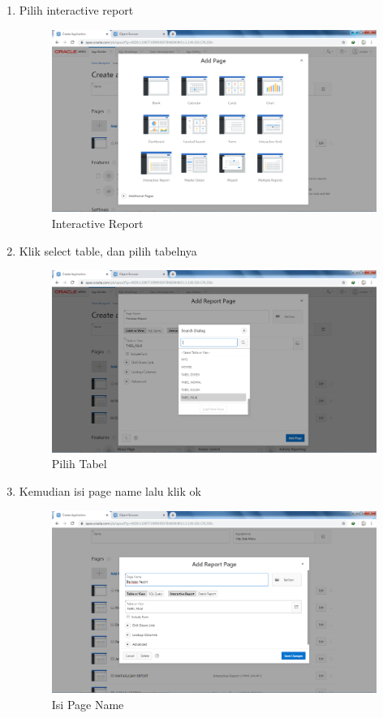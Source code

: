 \begin{enumerate}
\item Pilih interactive report
\begin{figure}[H]
\centering
\caption{Interactive Report}
\includegraphics[width=1\textwidth]{figures/15.png}
\end{figure}

\item Klik select table, dan pilih tabelnya
\begin{figure}[H]
\centering
\caption{Pilih Tabel}
\includegraphics[width=1\textwidth]{figures/16.png}
\end{figure}

\item Kemudian isi page name lalu klik ok
\begin{figure}[H]
\centering
\caption{Isi Page Name}
\includegraphics[width=1\textwidth]{figures/17.png}
\end{figure}


\end{enumerate}
